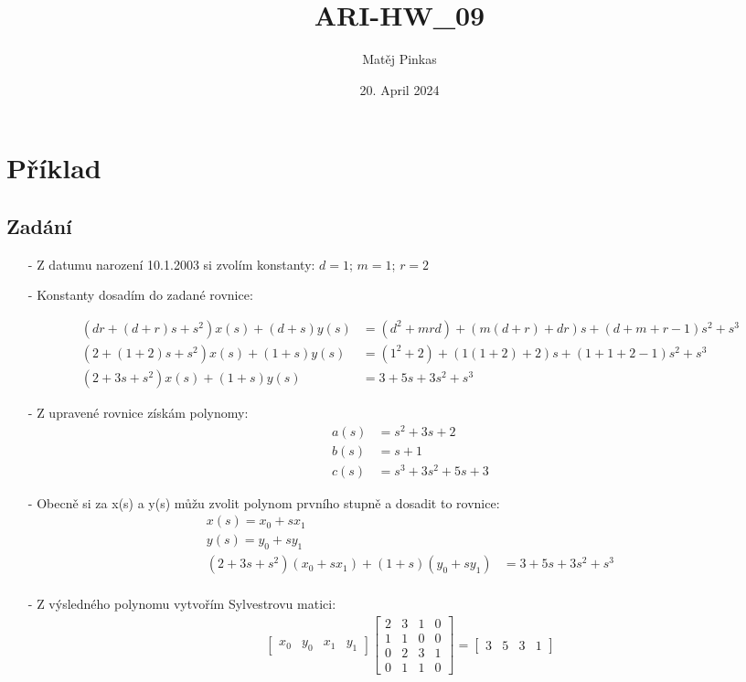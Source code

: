 \documentclass{article}
\title{ARI-HW\_09}
\author{Matěj Pinkas}
\date{20. April 2024}
\newcommand\mat[1]{\begin{bmatrix}#1\end{bmatrix}}
\begin{document}
\maketitle

\section{Příklad}
\subsection{Zadání}
\begin{itemize}
    \item[-] Z datumu narození 10.1.2003 si zvolím konstanty: $d=1$; $m=1$; $r=2$
    \item[-] Konstanty dosadím do zadané rovnice:

    \begin{align*}
        (dr+(d+r)s+s^2)x(s)+(d+s)y(s) &= (d^2+mrd)+(m(d+r)+dr)s+(d+m+r-1)s^2+s^3\\
        (2+(1+2)s+s^2)x(s)+(1+s)y(s) &= (1^2+2)+(1(1+2)+2)s+(1+1+2-1)s^2+s^3\\
        (2+3s+s^2)x(s)+(1+s)y(s) &= 3+5s+3s^2+s^3
    \end{align*}
    \item[-] Z upravené rovnice získám polynomy:
    \begin{align*}
        a(s) &= s^2+3s+2\\
        b(s) &= s+1\\
        c(s) &= s^3+3s^2+5s+3
    \end{align*}
    \item[-] Obecně si za x(s) a y(s) můžu zvolit polynom prvního stupně a dosadit to rovnice:
    \begin{align*}
        x(s) = x_0 + sx_1\\
        y(s) = y_0 + sy_1\\
        (2+3s+s^2)(x_0 + sx_1)+(1+s)(y_0 + sy_1) &= 3+5s+3s^2+s^3\\
    \end{align*}
    \item[-] Z výsledného polynomu vytvořím Sylvestrovu matici:
    \begin{align*}
        \mat{x_0 & y_0 & x_1 & y_1} \mat{2 & 3 & 1 & 0\\ 1 & 1 & 0 & 0\\ 0 & 2 & 3 & 1\\ 0 & 1 & 1 & 0} = \mat{3 & 5 & 3 & 1}
    \end{align*}


\end{itemize}
\end{document}
